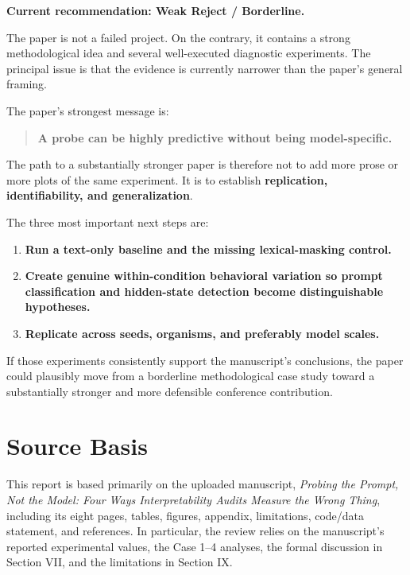 \documentclass[11pt,a4paper]{article}
\begin{document}
\textbf{Current recommendation: Weak Reject / Borderline.}

The paper is not a failed project. On the contrary, it contains a strong methodological idea and several well-executed diagnostic experiments. The principal issue is that the evidence is currently narrower than the paper's general framing.

The paper's strongest message is:

\begin{quote}
\textbf{A probe can be highly predictive without being model-specific.}
\end{quote}

The path to a substantially stronger paper is therefore not to add more prose or more plots of the same experiment. It is to establish \textbf{replication, identifiability, and generalization}.

The three most important next steps are:

\begin{enumerate}
    \item \textbf{Run a text-only baseline and the missing lexical-masking control.}
    \item \textbf{Create genuine within-condition behavioral variation so prompt classification and hidden-state detection become distinguishable hypotheses.}
    \item \textbf{Replicate across seeds, organisms, and preferably model scales.}
\end{enumerate}

If those experiments consistently support the manuscript's conclusions, the paper could plausibly move from a borderline methodological case study toward a substantially stronger and more defensible conference contribution.

\section*{Source Basis}

This report is based primarily on the uploaded manuscript, \textit{Probing the Prompt, Not the Model: Four Ways Interpretability Audits Measure the Wrong Thing}, including its eight pages, tables, figures, appendix, limitations, code/data statement, and references. In particular, the review relies on the manuscript's reported experimental values, the Case 1--4 analyses, the formal discussion in Section VII, and the limitations in Section IX.
\end{document}
